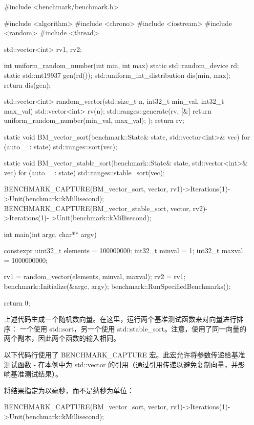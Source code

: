 \begin{cpp}
#include <benchmark/benchmark.h>

#include <algorithm>
#include <chrono>
#include <iostream>
#include <random>
#include <thread>

std::vector<int> rv1, rv2;

int uniform_random_number(int min, int max) {
    static std::random_device rd;
    static std::mt19937 gen(rd());
    std::uniform_int_distribution dis(min, max);
    return dis(gen);
}

std::vector<int> random_vector(std::size_t n, int32_t min_val, int32_t
max_val) {
    std::vector<int> rv(n);
    std::ranges::generate(rv, [&] {
        return uniform_random_number(min_val, max_val);
    });
    return rv;
}

static void BM_vector_sort(benchmark::State& state, std::vector<int>&
vec) {
    for (auto _ : state) {
        std::ranges::sort(vec);
    }
}

static void BM_vector_stable_sort(benchmark::State& state,
std::vector<int>& vec) {
    for (auto _ : state) {
        std::ranges::stable_sort(vec);
    }
}

BENCHMARK_CAPTURE(BM_vector_sort, vector, rv1)->Iterations(1)-
>Unit(benchmark::kMillisecond);
BENCHMARK_CAPTURE(BM_vector_stable_sort, vector, rv2)->Iterations(1)-
>Unit(benchmark::kMillisecond);

int main(int argc, char** argv) {
    constexpr uint32_t elements = 100000000;
    int32_t minval = 1;
    int32_t maxval = 1000000000;

    rv1 = random_vector(elements, minval, maxval);
    rv2 = rv1;
    benchmark::Initialize(&argc, argv);
    benchmark::RunSpecifiedBenchmarks();

    return 0;
}
\end{cpp}

上述代码生成一个随机数向量。在这里，运行两个基准测试函数来对向量进行排序： 一个使用 std::sort，另一个使用 std::stable\_sort。注意，使用了同一向量的两个副本，因此两个函数的输入相同。

以下代码行使用了 BENCHMARK\_CAPTURE 宏。此宏允许将参数传递给基准测试函数 - 在本例中为 std::vector 的引用（通过引用传递以避免复制向量，并影响基准测试结果）。

将结果指定为以毫秒，而不是纳秒为单位：

\begin{cpp}
BENCHMARK_CAPTURE(BM_vector_sort, vector, rv1)->Iterations(1)-
>Unit(benchmark::kMillisecond);
\end{cpp}

